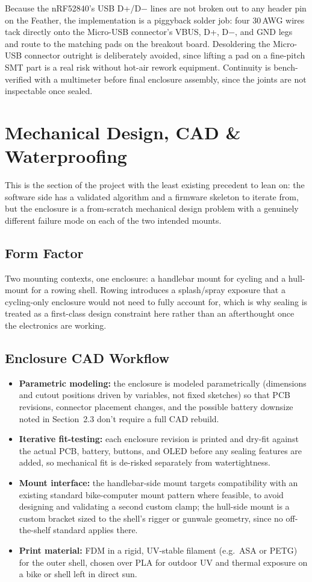 \documentclass[11pt]{article}
\begin{document}
Because the nRF52840's USB D+/D$-$ lines are not broken out to any header pin on the Feather, the implementation is a piggyback solder job: four 30\,AWG wires tack directly onto the Micro-USB connector's VBUS, D+, D$-$, and GND legs and route to the matching pads on the breakout board. Desoldering the Micro-USB connector outright is deliberately avoided, since lifting a pad on a fine-pitch SMT part is a real risk without hot-air rework equipment. Continuity is bench-verified with a multimeter before final enclosure assembly, since the joints are not inspectable once sealed.

\section{Mechanical Design, CAD \& Waterproofing}
This is the section of the project with the least existing precedent to lean on: the software side has a validated algorithm and a firmware skeleton to iterate from, but the enclosure is a from-scratch mechanical design problem with a genuinely different failure mode on each of the two intended mounts.

\subsection{Form Factor}
Two mounting contexts, one enclosure: a handlebar mount for cycling and a hull-mount for a rowing shell. Rowing introduces a splash/spray exposure that a cycling-only enclosure would not need to fully account for, which is why sealing is treated as a first-class design constraint here rather than an afterthought once the electronics are working.

\subsection{Enclosure CAD Workflow}
\begin{itemize}[topsep=2pt,itemsep=2pt]
    \item \textbf{Parametric modeling:} the enclosure is modeled parametrically (dimensions and cutout positions driven by variables, not fixed sketches) so that PCB revisions, connector placement changes, and the possible battery downsize noted in Section~2.3 don't require a full CAD rebuild.
    \item \textbf{Iterative fit-testing:} each enclosure revision is printed and dry-fit against the actual PCB, battery, buttons, and OLED before any sealing features are added, so mechanical fit is de-risked separately from watertightness.
    \item \textbf{Mount interface:} the handlebar-side mount targets compatibility with an existing standard bike-computer mount pattern where feasible, to avoid designing and validating a second custom clamp; the hull-side mount is a custom bracket sized to the shell's rigger or gunwale geometry, since no off-the-shelf standard applies there.
    \item \textbf{Print material:} FDM in a rigid, UV-stable filament (e.g.\ ASA or PETG) for the outer shell, chosen over PLA for outdoor UV and thermal exposure on a bike or shell left in direct sun.
\end{itemize}
\end{document}
